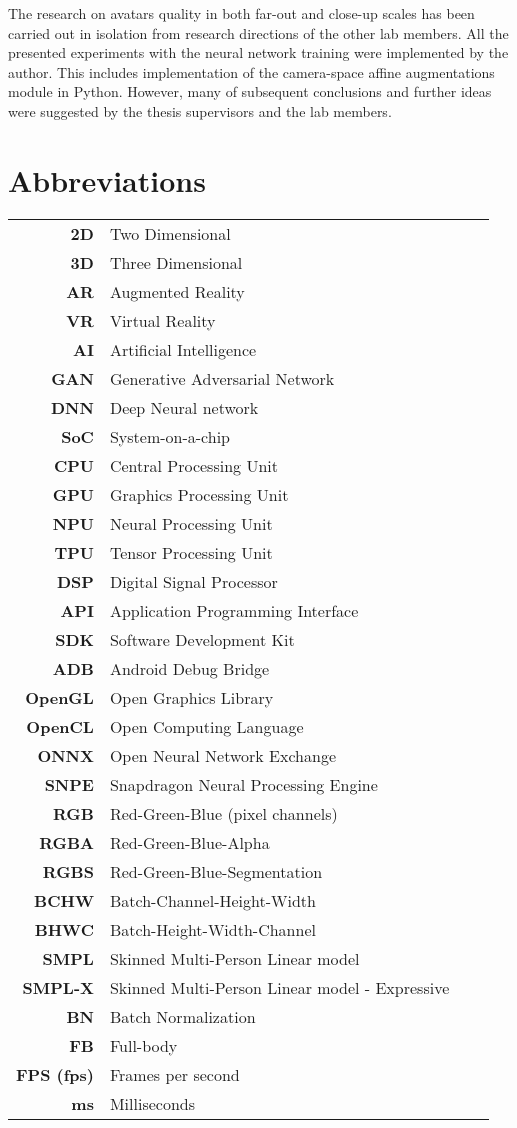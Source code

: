 The research on avatars quality in both far-out and close-up scales has been carried out in isolation from research directions of the other lab members. All the presented experiments with the neural network training were implemented by the author. This includes implementation of the camera-space affine augmentations module in Python. However, many of subsequent conclusions and further ideas were suggested by the thesis supervisors and the lab members.
 
\newpage
\section*{\centering Abbreviations}


\begin{center}
\begin{tabular}{>{\bf}r l >{\bf}r l}
	2D & Two Dimensional \\
	3D & Three Dimensional\\
	AR & Augmented Reality \\
	VR & Virtual Reality \\ 
	AI & Artificial Intelligence \\
	GAN & Generative Adversarial Network \\
	DNN & Deep Neural network \\
	SoC & System-on-a-chip \\
	CPU & Central Processing Unit \\
	GPU & Graphics Processing Unit \\
	NPU & Neural Processing Unit \\
	TPU & Tensor Processing Unit \\
	DSP & Digital Signal Processor \\
	API & Application Programming Interface \\
	SDK & Software Development Kit \\
	ADB & Android Debug Bridge \\
	OpenGL & Open Graphics Library \\
	OpenCL & Open Computing Language \\
	ONNX & Open Neural Network Exchange \\
	SNPE & Snapdragon Neural Processing Engine \\
	RGB & Red-Green-Blue (pixel channels) \\
	RGBA & Red-Green-Blue-Alpha \\
	RGBS & Red-Green-Blue-Segmentation \\
	BCHW & Batch-Channel-Height-Width \\
	BHWC & Batch-Height-Width-Channel \\
	SMPL & Skinned Multi-Person Linear model \cite{smpl} \\
	SMPL-X & Skinned Multi-Person Linear model - Expressive \cite{smplx}\\
	BN & Batch Normalization \\
	FB & Full-body \\
	FPS (fps) & Frames per second\\
	ms & Milliseconds \\
\end{tabular}
\end{center}
